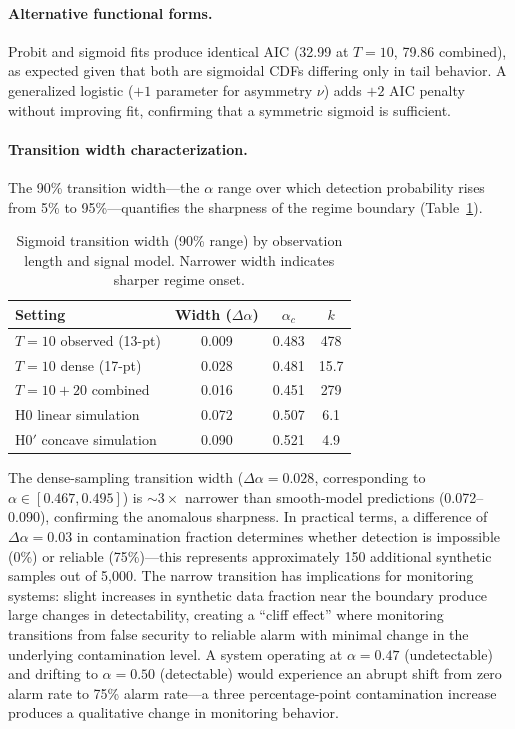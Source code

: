 \paragraph{Alternative functional forms.}
Probit and sigmoid fits produce identical AIC (32.99 at $T{=}10$, 79.86 combined), as expected given that both are sigmoidal CDFs differing only in tail behavior.
A generalized logistic ($+1$ parameter for asymmetry $\nu$) adds $+2$ AIC penalty without improving fit, confirming that a symmetric sigmoid is sufficient.

\paragraph{Transition width characterization.}
The 90\% transition width---the $\alpha$ range over which detection probability rises from 5\% to 95\%---quantifies the sharpness of the regime boundary (Table~\ref{tab:transition_width}).

\begin{table}[t]
\centering
\small
\caption{Sigmoid transition width (90\% range) by observation length and signal model. Narrower width indicates sharper regime onset.}
\label{tab:transition_width}
\begin{tabular}{lccc}
\toprule
Setting & Width ($\Delta\alpha$) & $\alpha_c$ & $k$ \\
\midrule
$T{=}10$ observed (13-pt) & 0.009 & 0.483 & 478 \\
$T{=}10$ dense (17-pt) & 0.028 & 0.481 & 15.7 \\
$T{=}10{+}20$ combined & 0.016 & 0.451 & 279 \\
H0 linear simulation & 0.072 & 0.507 & 6.1 \\
H0$'$ concave simulation & 0.090 & 0.521 & 4.9 \\
\bottomrule
\end{tabular}
\end{table}

The dense-sampling transition width ($\Delta\alpha{=}0.028$, corresponding to $\alpha \in [0.467, 0.495]$) is ${\sim}3{\times}$ narrower than smooth-model predictions (0.072--0.090), confirming the anomalous sharpness.
In practical terms, a difference of $\Delta\alpha{=}0.03$ in contamination fraction determines whether detection is impossible (0\%) or reliable (75\%)---this represents approximately 150 additional synthetic samples out of 5{,}000.
The narrow transition has implications for monitoring systems: slight increases in synthetic data fraction near the boundary produce large changes in detectability, creating a ``cliff effect'' where monitoring transitions from false security to reliable alarm with minimal change in the underlying contamination level.
A system operating at $\alpha{=}0.47$ (undetectable) and drifting to $\alpha{=}0.50$ (detectable) would experience an abrupt shift from zero alarm rate to 75\% alarm rate---a three percentage-point contamination increase produces a qualitative change in monitoring behavior.

